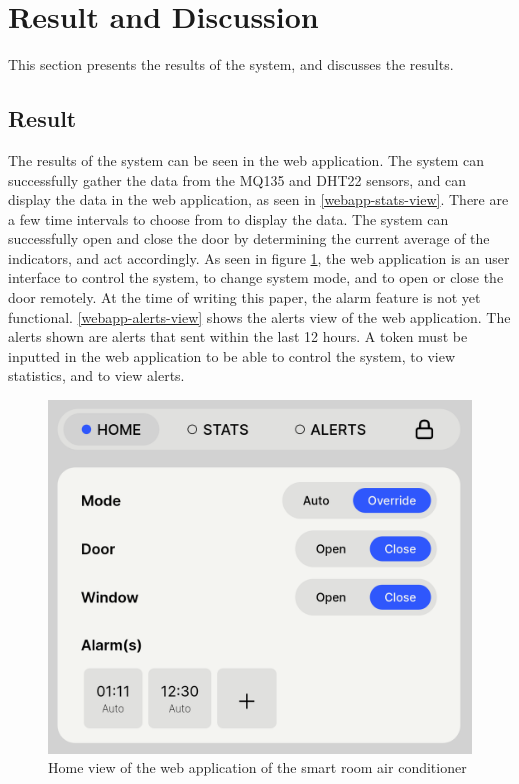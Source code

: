 \section{Result and Discussion}
This section presents the results of the system,
and discusses the results.

\subsection{Result}
The results of the system can be seen in the web
application. The system can successfully gather the data from the
MQ135 and DHT22 sensors, and can display the data in
the web application, as seen in \ref{webapp-stats-view}.
There are a few time intervals to choose from to display the data.
The system can successfully open and close the door by
determining the current average of the indicators,
and act accordingly. As seen in figure \ref{webapp-home-view},
the web application is an user interface to control the system,
to change system mode, and to open or close the door remotely.
At the time of writing this paper, the alarm feature is not yet functional.
\ref{webapp-alerts-view} shows the alerts view of the web application.
The alerts shown are alerts that sent within the last 12 hours.
A token must be inputted in the web application to be able to control the system,
to view statistics, and to view alerts.

\begin{figure}
      \centerline{\includegraphics[scale=0.2]{resources/webapp-home-view.png}}
      \caption{Home view of the web application of the smart room air conditioner}
      \label{webapp-home-view}
\end{figure}

